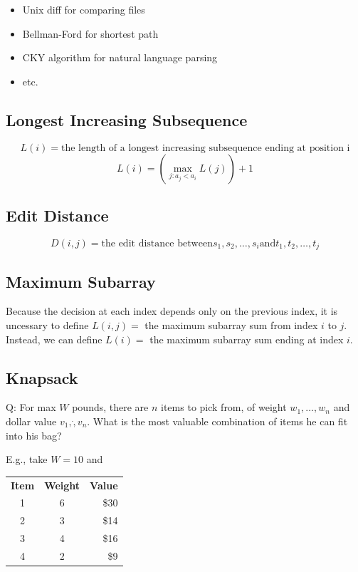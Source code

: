 \documentclass[12pt,a4paper]{article}
\begin{document}
\begin{itemize}
  \item Unix diff for comparing files
  \item Bellman-Ford for shortest path
  \item CKY algorithm for natural language parsing
  \item etc.
\end{itemize}

\subsection*{Longest Increasing Subsequence}

\[L(i) = \text{the length of a longest increasing subsequence ending at position i}\]
\[L(i) = (\max_{j:a_j < a_i}{L(j)})+1\]

\subsection*{Edit Distance}

\[D(i, j) = \text{the edit distance between} s_1,s_2,\dots,s_i \text{and} t_1,t_2,\dots,t_j\]

\subsection*{Maximum Subarray}

Because the decision at each index depends only on the previous index,
it is uncessary to define $L(i, j) = $ the maximum subarray sum from index $i$ to $j$.
Instead, we can define $L(i) = $ the maximum subarray sum ending at index $i$.

\subsection*{Knapsack}

Q: For max $W$ pounds, there are $n$ items to pick from, of weight $w_1, \dots, w_n$ and dollar value $v_1, \dot, v_n$. 
What is the most valuable combination of items he can fit into his bag?

E.g., take $W = 10$ and 

\begin{table}[h]
    \centering
    \begin{tabular}{c c r}
        \textbf{Item} & \textbf{Weight} & \textbf{Value} \\
        1 & 6 & \$30 \\
        2 & 3 & \$14 \\
        3 & 4 & \$16 \\
        4 & 2 & \$9 \\
    \end{tabular}
\end{table}
\end{document}
